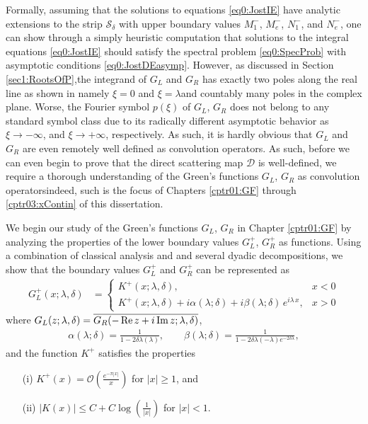 \documentclass[../dissertation.tex]{subfiles}
\begin{document}
Formally, assuming that the solutions to equations \eqref{eq0:JostIE} 
have analytic extensions to the strip $\mathcal S_\delta$ with upper
boundary values
$M_1^-$, $M_e^-$, $N_1^-$, and $N_e^-$, one can show through a simply 
heuristic computation that solutions to the integral equations \eqref{eq0:JostIE} 
should satisfy the spectral problem \eqref{eq0:SpecProb} with asymptotic 
conditions \eqref{eq0:JostDEasymp}. However, as discussed in Section 
\ref{sec1:RootsOfP},the integrand of $G_L$ and $G_R$ has exactly two poles 
along the real line as shown in \textemdash{}namely $\xi = 0$ and 
$\xi = \lambda$\textemdash{}and countably many poles in the complex plane. 
Worse, the Fourier symbol $p(\xi)$ of $G_L$, $G_R$ does not belong to any
standard symbol class due to its radically different asymptotic behavior 
as $\xi \to -\infty$, and $\xi \to +\infty$, respectively. As such,
it is hardly obvious that $G_L$ and $G_R$ are even remotely well 
defined as convolution operators. As such, before we can even begin to prove 
that the direct scattering map $\mathscr D$ is well-defined, we require a 
thorough understanding of the Green's functions $G_L$, $G_R$ as convolution 
operators\textemdash{}indeed, such is the focus of Chapters \ref{cptr01:GF} 
through \ref{cptr03:xContin} of this dissertation.

We begin our study of the Green's functions $G_L$, $G_R$ in Chapter 
\ref{cptr01:GF} by analyzing the properties of the lower boundary 
values $G_L^+$, $G_R^+$ as functions.
Using a combination of classical analysis and 
and several dyadic decompositions, we show
that the boundary values $G_L^+$ and $G_R^+$ can be represented as 
\begin{align}\label{eq0:GFrep}
	G_L^+(x; \lambda, \delta)
		&= 
			\begin{cases}
				K^+(x; \lambda, \delta), &x < 0 \\
				K^+(x; \lambda, \delta)
				+ i \alpha(\lambda; \delta) 
				+ i \beta(\lambda; \delta) \, e^{i \lambda \, x}, 
				&x >0 
			\end{cases}
\end{align}
where $G_L(z; \lambda, \delta) = \overline{G_R(-\operatorname{Re} z +i\operatorname{Im} z; \lambda, \delta)}$, 
\begin{align*}
	\alpha(\lambda; \delta) 
		= \frac{1}{1-2\delta\lambda(\lambda)},
	\qquad
	\beta(\lambda; \delta) 
		= \frac{1}{1 - 2\delta\lambda(-\lambda) e^{-2\delta\lambda}},
\end{align*}
and the function $K^+$ satisfies the properties
\begin{itemize}
	\item[(i)] $K^+(x) = \mathcal O \left( \frac{e^{-\pi|x|}}{x} \right)$ 
		for $|x| \geq 1$, and
	\item[(ii)] $|K(x)| \leq C + C \log\left(\frac{1}{|x|}\right)$ for $|x| < 1$.
\end{itemize}
\end{document}
